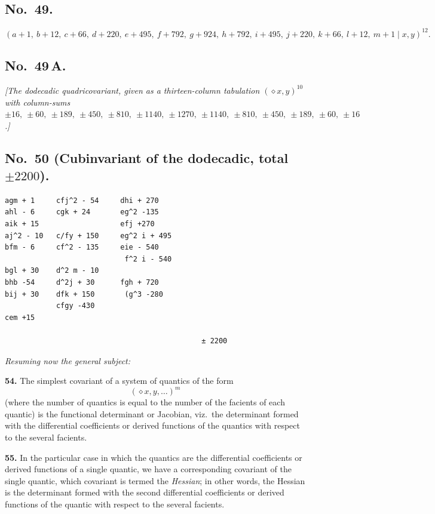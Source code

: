 \documentclass[11pt]{article}
\begin{document}
\subsection*{No.\ 49.}
\[
(a + 1,\ b + 12,\ c + 66,\ d + 220,\ e + 495,\ f + 792,\ g + 924,\ h + 792,\ i + 495,\ j + 220,\ k + 66,\ l + 12,\ m + 1 \mid x, y)^{12}.
\]

\subsection*{No.\ 49\,A.}

\textit{[The dodecadic quadricovariant, given as a thirteen-column tabulation $(\diamond x,y)^{10}$ with column-sums $\pm 16,\ \pm 60,\ \pm 189,\ \pm 450,\ \pm 810,\ \pm 1140,\ \pm 1270,\ \pm 1140,\ \pm 810,\ \pm 450,\ \pm 189,\ \pm 60,\ \pm 16$.]}

\subsection*{No.\ 50 (Cubinvariant of the dodecadic, total $\pm 2200$).}

\smallskip

\begin{small}
\begin{verbatim}
agm + 1     cfj^2 - 54     dhi + 270
ahl - 6     cgk + 24       eg^2 -135
aik + 15                   efj +270
aj^2 - 10   c/fy + 150     eg^2 i + 495
bfm - 6     cf^2 - 135     eie - 540
                            f^2 i - 540
bgl + 30    d^2 m - 10
bhb -54     d^2j + 30      fgh + 720
bij + 30    dfk + 150       (g^3 -280
            cfgy -430
cem +15

                                              ± 2200
\end{verbatim}
\end{small}

\bigskip

\noindent\textit{Resuming now the general subject:}

\medskip

\noindent\textbf{54.} The simplest covariant of a system of quantics of the form
\[
(\diamond x, y, \ldots)^m
\]
(where the number of quantics is equal to the number of the facients of each quantic) is the functional determinant or Jacobian, viz.\ the determinant formed with the differential coefficients or derived functions of the quantics with respect to the several facients.

\medskip

\noindent\textbf{55.} In the particular case in which the quantics are the differential coefficients or derived functions of a single quantic, we have a corresponding covariant of the single quantic, which covariant is termed the \textit{Hessian}; in other words, the Hessian is the determinant formed with the second differential coefficients or derived functions of the quantic with respect to the several facients.
\end{document}
